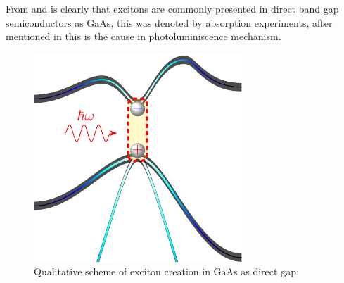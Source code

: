 From  and   is clearly that excitons are commonly presented in direct band gap semiconductors as GaAs, this was denoted by absorption experiments,  after mentioned in  this is the cause in photoluminiscence mechanism.

\begin{figure}[H]
	\centering
	\includegraphics[width=0.5\linewidth]{../figures/chapter-1/exciton-1/build/x-1}
	\caption{Qualitative scheme of exciton creation in GaAs as direct gap.}
	\label{fig:subsubsection-1.1.1-x-1}
\end{figure}

